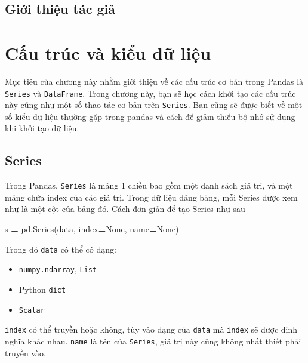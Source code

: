 \documentclass[
]{book}
\newenvironment{Shaded}{\begin{snugshade}}{\end{snugshade}}
\newcommand{\NormalTok}[1]{#1}
\newcommand{\OperatorTok}[1]{\textcolor[rgb]{0.81,0.36,0.00}{\textbf{#1}}}
\newcommand{\VariableTok}[1]{\textcolor[rgb]{0.00,0.00,0.00}{#1}}
\begin{document}
\hypertarget{giux1edbi-thiux1ec7u-tuxe1c-giux1ea3}{%
\section*{Giới thiệu tác giả}\label{giux1edbi-thiux1ec7u-tuxe1c-giux1ea3}}


\hypertarget{cux1ea5u-truxfac-vuxe0-kiux1ec3u-dux1eef-liux1ec7u}{%
\chapter{Cấu trúc và kiểu dữ liệu}\label{cux1ea5u-truxfac-vuxe0-kiux1ec3u-dux1eef-liux1ec7u}}

Mục tiêu của chương này nhằm giới thiệu về các cấu trúc cơ bản trong Pandas là \texttt{Series} và \texttt{DataFrame}.
Trong chương này, bạn sẽ học cách khởi tạo các cấu trúc này cũng như một số thao tác cơ bản trên \texttt{Series}.
Bạn cũng sẽ được biết về một số kiểu dữ liệu thường gặp trong pandas và cách để giảm thiểu bộ nhớ sử dụng khi khởi tạo dữ liệu.

\hypertarget{series}{%
\section{Series}\label{series}}

Trong Pandas, \texttt{Series} là mảng 1 chiều bao gồm một danh sách giá trị, và một mảng chứa index
của các giá trị. Trong dữ liệu dảng bảng, mỗi Series được xem như là một cột của bảng đó.
Cách đơn giản để tạo Series như sau

\begin{Shaded}
\begin{Highlighting}[]
\NormalTok{s }\OperatorTok{=}\NormalTok{ pd.Series(data, index}\OperatorTok{=}\VariableTok{None}\NormalTok{, name}\OperatorTok{=}\VariableTok{None}\NormalTok{)}
\end{Highlighting}
\end{Shaded}

Trong đó \texttt{data} có thể có dạng:

\begin{itemize}
\item
  \texttt{numpy.ndarray}, \texttt{List}
\item
  Python \texttt{dict}
\item
  \texttt{Scalar}
\end{itemize}

\texttt{index} có thể truyền hoặc không, tùy vào dạng của \texttt{data} mà \texttt{index} sẽ được định nghĩa khác nhau.
\texttt{name} là tên của \texttt{Series}, giá trị này cũng không nhất thiết phải truyền vào.
\end{document}
